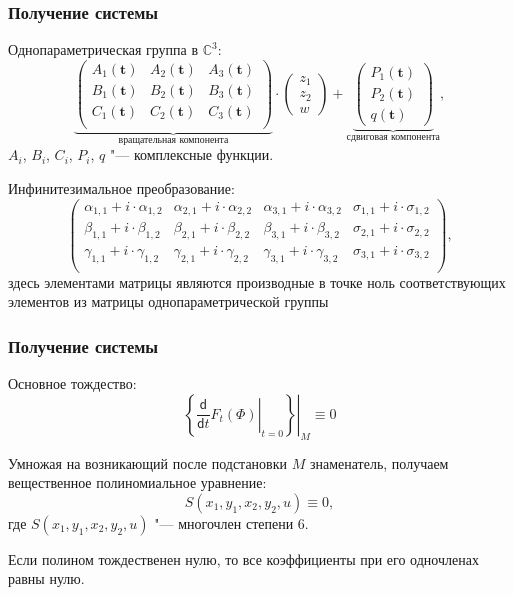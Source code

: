 \documentclass[russian,hyperref={unicode}]{beamer}
\begin{document}
{
	\frametitle{Получение системы}
	Однопараметрическая группа  в $\mathbb{C}^3$:
	\begin{equation*}
	\underbrace{
	\begin{pmatrix}
		A_1(\mathbf t) & A_2(\mathbf t) & A_3(\mathbf t) \\
		B_1(\mathbf t) & B_2(\mathbf t) & B_3(\mathbf t) \\
		C_1(\mathbf t) & C_2(\mathbf t) & C_3(\mathbf t) \\
	\end{pmatrix}}_\text{вращательная компонента}
	\cdot
	\begin{pmatrix}
		z_1 \\
		z_2 \\
		w
	\end{pmatrix}
	+
	\underbrace{
	\begin{pmatrix}
		P_1(\mathbf t) \\
		P_2(\mathbf t) \\
		q(\mathbf t)
	\end{pmatrix}}_\text{сдвиговая компонента},
	\end{equation*}
	$A_i$, $B_i$, $C_i$, $P_i$, $q$ "--- комплексные функции.
	
	Инфинитезимальное преобразование:
\begin{equation*}
\begin{pmatrix}
\alpha_{1,1} + i\cdot\alpha_{1,2} & \alpha_{2,1} + i\cdot\alpha_{2,2} & \alpha_{3,1} + i\cdot\alpha_{3,2} & \sigma_{1,1} + i\cdot\sigma_{1,2} \\
 \beta_{1,1} +  i\cdot\beta_{1,2} &  \beta_{2,1} +  i\cdot\beta_{2,2} &  \beta_{3,1} +  i\cdot\beta_{3,2} & \sigma_{2,1} + i\cdot\sigma_{2,2} \\
\gamma_{1,1} + i\cdot\gamma_{1,2} & \gamma_{2,1} + i\cdot\gamma_{2,2} & \gamma_{3,1} + i\cdot\gamma_{3,2} & \sigma_{3,1} + i\cdot\sigma_{3,2} \\
\end{pmatrix},
\end{equation*}
	здесь элементами матрицы являются производные в точке ноль соответствующих элементов из матрицы однопараметрической группы
}
\frame
{
	\frametitle{Получение системы}
	 Основное тождество:
 	$$
  	\left.\left\{ \left.\frac{\mathsf d}{\mathsf d t}F_t(\Phi) \right|_{t=0}\right\}\right|_{M} \equiv 0
	$$
  
  Умножая на возникающий после подстановки $M$ знаменатель, получаем вещественное полиномиальное уравнение:
  $$
  	S(x_1, y_1, x_2, y_2, u) \equiv 0,
  $$
  где $S(x_1, y_1, x_2, y_2, u)$ "--- многочлен степени 6.
  
  Если полином тождественен нулю, то все коэффициенты при его одночленах равны нулю. 
}
\end{document}
